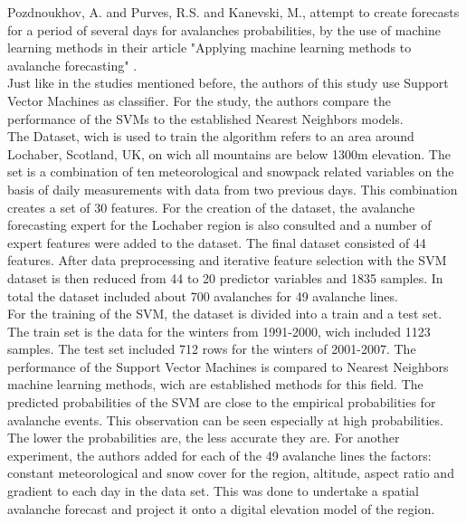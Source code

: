 \documentclass[../masterarbeit.tex]{subfiles}
\begin{document}
Pozdnoukhov, A. and Purves, R.S. and Kanevski, M., attempt to create forecasts for a period of several days for avalanches probabilities, by the use of machine learning methods in their article "Applying machine learning methods to avalanche forecasting" \textcite[]{Pozdnoukhov:2008}.  \\
Just like in the studies mentioned before, the authors of this study use Support Vector Machines as classifier. For the study, the authors compare the performance of the SVMs to the established Nearest Neighbors models. \autocite[]{Pozdnoukhov:2008} \\
The Dataset, wich is used to train the algorithm refers to an area around Lochaber, Scotland, UK, on wich all mountains are below 1300m elevation. The set is a combination of ten meteorological and snowpack related variables on the basis of daily measurements with data from two previous days. This combination creates a set of 30 features. For the creation of the dataset, the avalanche forecasting expert for the Lochaber region is also consulted and a number of expert features were added to the dataset. The final dataset consisted of 44 features. 
 After data preprocessing and iterative feature selection with the SVM dataset is then reduced from 44 to 20 predictor variables and 1835 samples. In total the dataset included about 700 avalanches for 49 avalanche lines. \autocite[]{Pozdnoukhov:2008} \\
 For the training of the SVM, the dataset is divided into a train and a test set. The train set is the data for the winters from 1991-2000, wich included 1123 samples. The test set included 712 rows for the winters of 2001-2007. 
The performance of the Support Vector Machines is compared to Nearest Neighbors machine learning methods, wich are established methods for this field. The predicted probabilities of the SVM are close to the empirical probabilities for avalanche events. This observation can be seen especially at high probabilities. The lower the probabilities are, the less accurate they are. For another experiment, the authors added for each of the 49 avalanche lines the factors: constant meteorological and snow cover for the region, altitude, aspect ratio and gradient to each day in the data set. This was done to undertake a spatial avalanche forecast and project it onto a digital elevation model of the region. \autocite[]{Pozdnoukhov:2008} \\
\end{document}
